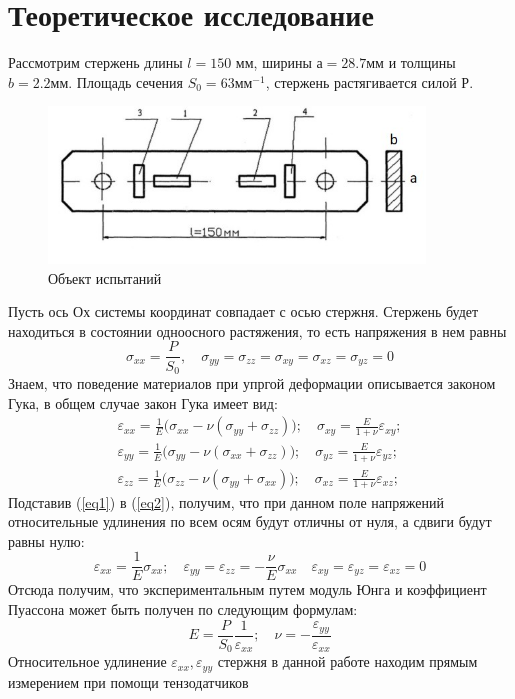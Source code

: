 \documentclass[12pt, a4paper]{article}
\begin{document}
\section*{Теоретическое исследование}
	Рассмотрим стержень длины $l = 150 \text{ мм}$, ширины $а = 28.7 мм$ и толщины $b = 2.2 мм$. Площадь сечения  $ S_{0} = 63 мм^{-1}$, стержень растягивается силой Р.
	\begin{figure}[h]
        \centering
        \includegraphics[width = 10cm]{Lab2_1.jpg}
        \caption{Объект испытаний}
        \label{im1}
    \end{figure}
    
     Пусть ось Ох системы координат совпадает с осью стержня. Стержень будет находиться в состоянии одноосного растяжения, то есть напряжения в 
нем равны
\begin{equation}
	\sigma_{xx} = \frac{P}{S_{0}},\quad \sigma_{yy} = \sigma_{zz}			=\sigma_{xy} = \sigma_{xz} = \sigma_{yz} = 0
	\label{eq1}
\end{equation}
Знаем, что поведение материалов при упргой деформации описывается законом Гука, в общем случае закон Гука имеет вид:
\begin{equation}
\begin{aligned}
\varepsilon_{xx} = \frac{1}{E}\Big(\sigma_{xx} - \nu(\sigma_{yy} + \sigma_{zz})\Big); \quad \sigma_{xy} = \frac{E}{1 + \nu}\varepsilon_{xy};
\\
\varepsilon_{yy} = \frac{1}{E}\Big(\sigma_{yy} - \nu(\sigma_{xx} + \sigma_{zz})\Big);\quad  \sigma_{yz} = \frac{E}{1 + \nu}\varepsilon_{yz};
    \\
\varepsilon_{zz} = \frac{1}{E}\Big(\sigma_{zz} - \nu(\sigma_{yy} + \sigma_{xx})\Big); \quad \sigma_{xz} = \frac{E}{1 + \nu}\varepsilon_{xz};
\end{aligned}
\label{eq2}
\end{equation}
Подставив (\ref{eq1}) в (\ref{eq2}), получим, что при данном поле напряжений относительные удлинения по всем осям будут отличны от нуля, а сдвиги будут равны нулю:
\begin{equation}
\varepsilon_{xx} = \frac{1}{E}\sigma_{xx}; \quad \varepsilon_{yy} = \varepsilon_{zz}= - \frac{\nu}{E}\sigma_{xx} \quad \varepsilon_{xy} = \varepsilon_{yz} = \varepsilon_{xz} = 0
\label{eq3}
\end{equation}
Отсюда получим, что экспериментальным путем модуль Юнга и коэффициент Пуассона может быть получен по следующим формулам:
\begin{equation}
E = \frac{P}{S_{0}}\frac{1}{\varepsilon_{xx}}; \quad \nu = - \frac{\varepsilon_{yy}}{\varepsilon_{xx}}
\label{eq4}
\end{equation}
	Относительное удлинение $ \varepsilon_{xx}, \varepsilon_{yy} $ стержня в данной работе находим прямым измерением при помощи тензодатчиков
	
\end{document}
